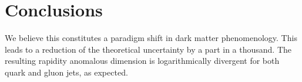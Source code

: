 \section{Conclusions}\label{sec:conclusions}

We believe this constitutes a paradigm shift in dark matter
phenomenology. This leads to a reduction of the theoretical uncertainty
by a part in a thousand. The resulting rapidity anomalous dimension is
logarithmically divergent for both quark and gluon jets, as expected.

